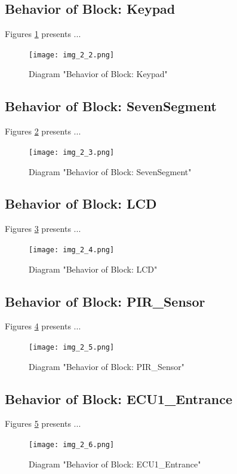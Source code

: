 \subsection{Behavior of Block: Keypad}
Figures \ref{fig:KeypadKeypad22} presents ...
\begin{figure}[htb]
\centering
\texttt{[image: img\_2\_2.png]}
\caption{Diagram "Behavior of Block: Keypad"}
\label{fig:KeypadKeypad22}
\end{figure}

\subsection{Behavior of Block: SevenSegment}
Figures \ref{fig:SevenSegmentSevenSegment23} presents ...
\begin{figure}[htb]
\centering
\texttt{[image: img\_2\_3.png]}
\caption{Diagram "Behavior of Block: SevenSegment"}
\label{fig:SevenSegmentSevenSegment23}
\end{figure}

\subsection{Behavior of Block: LCD}
Figures \ref{fig:LCDLCD24} presents ...
\begin{figure}[htb]
\centering
\texttt{[image: img\_2\_4.png]}
\caption{Diagram "Behavior of Block: LCD"}
\label{fig:LCDLCD24}
\end{figure}

\subsection{Behavior of Block: PIR\_Sensor}
Figures \ref{fig:PIRSensorPIRSensor25} presents ...
\begin{figure}[htb]
\centering
\texttt{[image: img\_2\_5.png]}
\caption{Diagram "Behavior of Block: PIR\_Sensor"}
\label{fig:PIRSensorPIRSensor25}
\end{figure}

\subsection{Behavior of Block: ECU1\_Entrance}
Figures \ref{fig:ECU1EntranceECU1Entrance26} presents ...
\begin{figure}[htb]
\centering
\texttt{[image: img\_2\_6.png]}
\caption{Diagram "Behavior of Block: ECU1\_Entrance"}
\label{fig:ECU1EntranceECU1Entrance26}
\end{figure}

